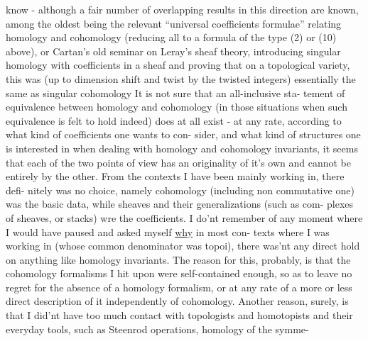 
know -  although a fair number of  overlapping results in this direction
are known,  among the oldest being the relevant ``universal coefficients
formulae''  relating homology and cohomology (reducing all to a formula of
the type (2) or (10) above),  or Cartan's old seminar on  Leray's
sheaf theory,   introducing singular homology with coefficients
in a sheaf and proving that on a topological variety,  this was (up to
dimension shift and twist by the  twisted integers) essentially
the same as singular cohomology It is not sure that an all-inclusive sta-%
tement of equivalence between homology and cohomology (in those situations
when such equivalence is felt to hold indeed) does at all exist  - 
at any rate,  according to what kind of coefficients  one wants to con-%
sider,  and what kind of  structures one is interested in when dealing with
homology and cohomology invariants,  it seems that each of the two points
of view has an originality  of it's own and cannot be entirely   by
the other.  From the contexts I have been mainly working in,  there defi-%
nitely was no choice,  namely cohomology (including non commutative one)
was the basic data,  while sheaves and their generalizations (such as com-%
plexes of sheaves,  or stacks)  wre the coefficients.  I do'nt remember
of any moment where I would have paused and asked myself \uline{why} in most con-%
texts where I was working in (whose common denominator was topoi),  there
was'nt any direct hold on anything like homology invariants.  The reason
for this,  probably,  is that the cohomology formalisms I hit upon were
self-contained enough,  so as to leave no regret for the absence of a
homology formalism,  or at any rate of a more or less direct description
of it independently of cohomology.  Another reason,  surely,  is that I
did'nt have too much contact with topologists and homotopists and their
everyday  tools,  such as Steenrod operations,  homology of the symme-%
